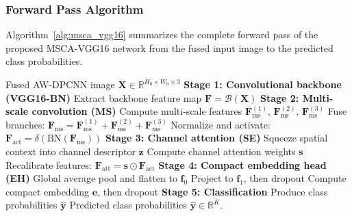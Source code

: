 \documentclass[pdflatex,sn-mathphys-num]{sn-jnl}
\theoremstyle{thmstyleone}%
\theoremstyle{thmstyletwo}%
\theoremstyle{thmstylethree}%
\begin{document}
\subsubsection{Forward Pass Algorithm}

Algorithm~\ref{alg:msca_vgg16} summarizes the complete forward pass of the proposed MSCA-VGG16 network from the fused input image to the predicted class probabilities.

\begin{algorithm}
\caption{Forward Pass of MSCA-VGG16}
\label{alg:msca_vgg16}
\begin{algorithmic}[1]
\Require Fused AW-DPCNN image $\boldsymbol{X} \in \mathbb{R}^{H_0 \times W_0 \times 3}$
\Statex \textbf{Stage 1: Convolutional backbone (VGG16-BN)}
\State Extract backbone feature map $\boldsymbol{F} = \mathcal{B}(\boldsymbol{X})$ 
\Statex \textbf{Stage 2: Multi-scale convolution (MS)}
\State Compute multi-scale features $\boldsymbol{F}_{\mathrm{ms}}^{(1)}$, $\boldsymbol{F}_{\mathrm{ms}}^{(2)}$, $\boldsymbol{F}_{\mathrm{ms}}^{(3)}$ 
\State Fuse branches: $\boldsymbol{F}_{\mathrm{ms}} = \boldsymbol{F}_{\mathrm{ms}}^{(1)} + \boldsymbol{F}_{\mathrm{ms}}^{(2)} + \boldsymbol{F}_{\mathrm{ms}}^{(3)}$ 
\State Normalize and activate: $\boldsymbol{F}_{\mathrm{act}} = \delta(\mathrm{BN}(\boldsymbol{F}_{\mathrm{ms}}))$ 
\Statex \textbf{Stage 3: Channel attention (SE)}
\State Squeeze spatial context into channel descriptor $\boldsymbol{z}$ 
\State Compute channel attention weights $\boldsymbol{s}$ 
\State Recalibrate features: $\boldsymbol{F}_{\mathrm{att}} = \boldsymbol{s} \odot \boldsymbol{F}_{\mathrm{act}}$ 
\Statex \textbf{Stage 4: Compact embedding head (EH)}
\State Global average pool and flatten to $\boldsymbol{f}_0$ 
\State Project to $\boldsymbol{f}_1$, then dropout 
\State Compute compact embedding $\boldsymbol{e}$, then dropout 
\Statex \textbf{Stage 5: Classification}
\State Produce class probabilities $\hat{\boldsymbol{y}}$ 
\Ensure Predicted class probabilities $\hat{\boldsymbol{y}} \in \mathbb{R}^{K}$.
\end{algorithmic}
\end{algorithm}
\end{document}
